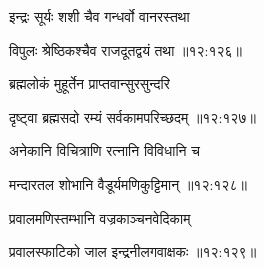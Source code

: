 {\devanagarifont इन्द्रः सूर्यः शशी चैव गन्धर्वो वानरस्तथा \thinspace{\dandab} \dontdisplaylinenum }%


{\devanagarifont विपुलः श्रेष्ठिकश्चैव राजदूतद्वयं तथा {॥१२:१२६॥} \veg\dontdisplaylinenum }%

{\devanagarifont ब्रह्मलोकं मुहूर्तेन प्राप्तवान्सुरसुन्दरि \thinspace{\dandab} \dontdisplaylinenum }%


{\devanagarifont दृष्ट्वा ब्रह्मसदो रम्यं सर्वकामपरिच्छदम् {॥१२:१२७॥} \veg\dontdisplaylinenum }%

{\devanagarifont अनेकानि विचित्राणि रत्नानि विविधानि च \thinspace{\dandab} \dontdisplaylinenum }%
 

{\devanagarifont मन्दारतल शोभानि वैडूर्यमणिकुट्टिमान् {॥१२:१२८॥} \veg\dontdisplaylinenum }%

{\devanagarifont प्रवालमणिस्तम्भानि वज्रकाञ्चनवेदिकाम् \thinspace{\dandab} \dontdisplaylinenum }%


{\devanagarifont प्रवालस्फाटिको जाल इन्द्रनीलगवाक्षकः {॥१२:१२९॥} \veg\dontdisplaylinenum }%

